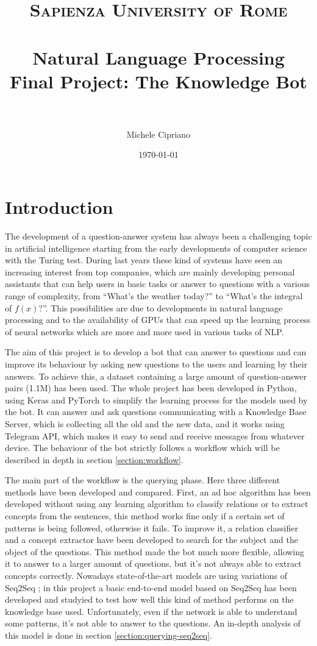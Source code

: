 \documentclass[paper=a4, fontsize=11pt]{scrartcl} %
\title{	
\normalfont \normalsize 
\textsc{Sapienza University of Rome} \\ [25pt] %
\horrule{0.5pt} \\[0.4cm] %
\huge Natural Language Processing \\ %
\large Final Project: The Knowledge Bot \\
\horrule{2pt} \\[0.5cm] %
}
\author{Michele Cipriano} %
\date{\normalsize\today} %
\numberwithin{equation}{section} %
\numberwithin{figure}{section} %
\numberwithin{table}{section} %
\theoremstyle{definition}
\begin{document}
\maketitle %


\section{Introduction}

The development of a question-answer system has always been a challenging 
topic in artificial intelligence starting from the early developments
of computer science with the Turing test.
During last years these kind of systems have seen an increasing interest 
from top companies, which are mainly developing personal assistants that can
help users in basic tasks or answer to questions with a various range of complexity,
from ``What's the weather today?'' to ``What's the integral of $f(x)$?''.
This possibilities are due to developments in natural language processing and
to the availability of GPUs that can speed up the learning process of
neural networks which are more and more used in various tasks of NLP.

The aim of this project is to develop a bot that can answer to questions and
can improve its behaviour by asking new questions to the users and learning
by their answers.
To achieve this, a dataset containing a large amount of question-answer pairs
(1.1M) has been used.
The whole project has
been developed in Python, using Keras and PyTorch to simplify the learning
process for the models used by the bot. It can answer and ask questions
communicating with a Knowledge Base Server, which is collecting all the
old and the new data, and it works using Telegram API, which makes it easy to
send and receive messages from whatever device. The behaviour of the bot
strictly follows a workflow which will be described in depth in section
\ref{section:workflow}.

The main part of the workflow is the querying phase. Here three different
methods have been developed and compared. First, an ad hoc algorithm has been
developed without using any learning algorithm to classify relations or to extract concepts from
the sentences, this method works fine only if a certain set of patterns
is being followed, otherwise it fails. To improve it, a relation classifier
and a concept extractor have been developed to
search for the subject and the object of the questions. This method made
the bot much more flexible, allowing it to answer to a larger amount of
questions, but it's not always able to extract concepts correctly. Nowadays state-of-the-art models are using variations of
Seq2Seq \cite{Sutskever:2014:SSL:2969033.2969173};
in this project a basic end-to-end model based on Seq2Seq has been
developed and studyied to test how well this kind of method performs on the knowledge base
used. Unfortunately, even if the
network is able to understand some patterns, it's not able to answer to the
questions. An in-depth analysis of this model is done in section
\ref{section:querying-seq2seq}.
\end{document}
